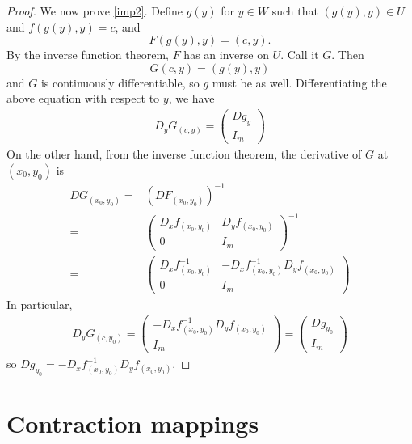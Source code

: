 \documentclass[12pt,reqno]{amsart}
\theoremstyle{definition}
\begin{document}
\begin{proof}
  We now prove \ref{imp2}. Define $g(y)$ for $y \in W$ such that
  $(g(y),y) \in U$ and $f(g(y),y) = c$, and 
  \[ F(g(y),y) = (c,y). \]
  By the inverse function theorem, $F$ has an inverse on $U$. Call it
  $G$. Then
  \[ G(c,y) = (g(y),y) \]
  and $G$ is continuously differentiable, so $g$ must be as
  well. Differentiating the above equation with respect to $y$, we
  have
  \begin{align*}
    D_y G_{(c,y)} = \begin{pmatrix} Dg_y \\ I_m \end{pmatrix} 
  \end{align*}
  On the other hand, from the inverse function theorem, the derivative
  of $G$ at $(x_0,y_0)$ is
  \begin{align*}
    DG_{(x_0,y_0)} = & \left(DF_{(x_0,y_0)} \right)^{-1} \\
    = & \begin{pmatrix} D_xf_{(x_0,y_0)} &  D_yf_{(x_0,y_0)}  \\
      0 & I_m \end{pmatrix}^{-1} \\
    = & \begin{pmatrix} D_xf_{(x_0,y_0)}^{-1} & -D_xf_{(x_0,y_0)}^{-1} D_y
      f_{(x_0,y_0)} \\
      0 & I_m \end{pmatrix}
  \end{align*}
  In particular, 
  \begin{align*}
    D_y G_{(c,y_0)}  = \begin{pmatrix} -D_xf_{(x_0,y_0)}^{-1} D_y
      f_{(x_0,y_0)} \\
      I_m \end{pmatrix} = \begin{pmatrix} Dg_{y_0} \\
      I_m \end{pmatrix} 
  \end{align*}
  so $Dg_{y_0} = -D_xf_{(x_0,y_0)}^{-1} D_y f_{(x_0,y_0)}$.  
\end{proof}

\section{Contraction mappings}
\end{document}
